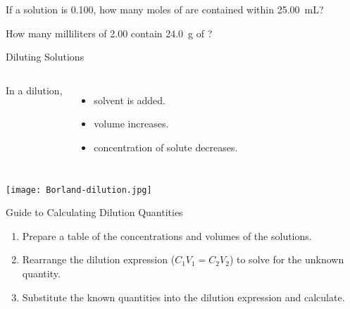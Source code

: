 \documentclass[notes=hide]{beamer}
\begin{document}
\begin{onyourown}
	If a solution is \SI{0.100}{\Molar}, how many moles of  are
	contained within \SI{25.00}{\milli\liter}?
\end{onyourown}

\begin{onyourown}
	How many milliliters of \SI{2.00}{\Molar}  contain
	\SI{24.0}{\gram} of ?
\end{onyourown}

\clearpage

\begin{frame}{Diluting Solutions}
	\begin{columns}
	In a \alert{dilution},
	\begin{itemize}
		\item solvent is added.
		\item volume increases.
		\item concentration of solute \alert{decreases}.
	\end{itemize}
	\end{columns}
	
	\bigskip
	
	\begin{center}
		\texttt{[image: Borland-dilution.jpg]}
	\end{center}

\end{frame}

\begin{frame}{Guide to Calculating Dilution Quantities}
	\begin{enumerate}
		\item Prepare a table of the concentrations and volumes of
			the solutions.
		\item Rearrange the dilution expression ($C_1V_1 = C_2V_2$) to
			solve for the unknown quantity.
		\item Substitute the known quantities into the dilution
			expression and calculate.
	\end{enumerate}
\end{frame}
\end{document}
